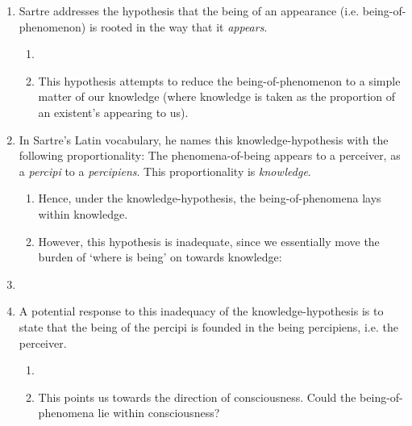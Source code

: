 \begin{enumerate}
  \item Sartre addresses the hypothesis that the being of an appearance (i.e. being-of-phenomenon) is rooted in the way that it \emph{appears}.
  \begin{enumerate}
    \item {}
    \item This hypothesis attempts to reduce the being-of-phenomenon to a simple matter of our knowledge (where knowledge is taken as the proportion of an existent's appearing to us).
  \end{enumerate}
  \item In Sartre's Latin vocabulary, he names this knowledge-hypothesis with the following proportionality: The phenomena-of-being appears to a perceiver, as a \emph{percipi} to a \emph{percipiens}. This proportionality is \emph{knowledge}.
  \begin{enumerate}
    \item Hence, under the knowledge-hypothesis, the being-of-phenomena lays within knowledge.
    \item However, this hypothesis is inadequate, since we essentially move the burden of \enquote*{where is being} on towards knowledge:
  \end{enumerate}
  \item {}
  \item A potential response to this inadequacy of the knowledge-hypothesis is to state that the being of the percipi is founded in the being percipiens, i.e. the perceiver.
  \begin{enumerate}
    \item {}
    \item This points us towards the direction of consciousness. Could the being-of-phenomena lie within consciousness?
  \end{enumerate}
\end{enumerate}

